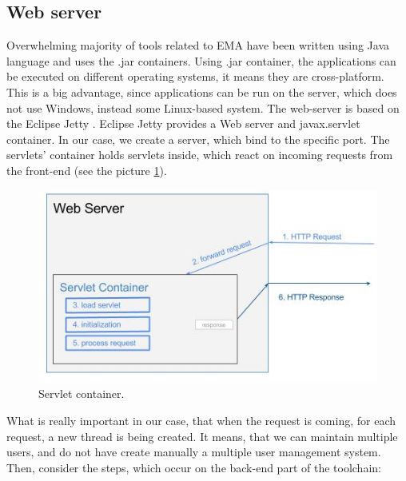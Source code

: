 \subsection{Web server}
Overwhelming majority of tools related to EMA have been written using Java language and uses the .jar containers. Using .jar container, the applications can be executed on different operating systems, it means they are cross-platform. This is a big advantage, since applications can be run on the server, which does not use Windows, instead some Linux-based system. The web-server is based on the Eclipse Jetty \cite{Jetty}. Eclipse Jetty provides a Web server and javax.servlet container. In our case, we create a server, which bind to the specific port. The servlets' container holds servlets inside, which react on incoming requests from the front-end (see the picture \ref{fig:servlet}). \newline
\begin{figure}[h!]
    \centering
    \includegraphics[width=0.6\linewidth]{src/pic/servlet-container-life-cycle}
    \caption{Servlet container.}
    \label{fig:servlet}
\end{figure} \newline
What is really important in our case, that when the request is coming, for each request, a new thread is being created. It means, that we can maintain multiple users, and do not have create manually a multiple user management system. \newline
Then, consider the steps, which occur on the back-end part of the toolchain:
